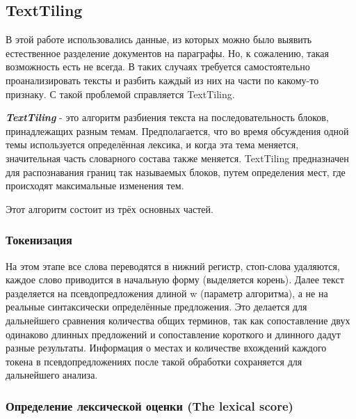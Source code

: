 \documentclass[14pt]{matmex-diploma-custom}
\begin{document}
\subsection{TextTiling}

В этой работе использовались данные, из которых можно было выявить естественное разделение документов на параграфы. Но, к сожалению, такая возможность есть не всегда. В таких случаях требуется самостоятельно проанализировать тексты и разбить каждый из них на части по какому-то признаку. С такой проблемой справляется TextTiling.

\textbf{\textit{TextTiling}} - это алгоритм разбиения текста на последовательность блоков, принадлежащих разным темам. Предполагается, что во время обсуждения одной темы используется определённая лексика, и когда эта тема меняется, значительная часть словарного состава также меняется. TextTiling предназначен для распознавания границ так называемых блоков, путем определения мест, где происходят максимальные изменения тем. 

Этот алгоритм состоит из трёх основных частей.

\subsubsection{Токенизация}
На этом этапе все слова переводятся в нижний регистр, стоп-слова удаляются, каждое слово приводится в начальную форму (выделяется корень). Далее текст разделяется на псевдопредложения длиной w (параметр алгоритма), а не на реальные синтаксически определённые предложения. Это делается для дальнейшего сравнения количества общих терминов, так как сопоставление двух одинаково длинных предложений и сопоставление короткого и длинного дадут разные результаты. Информация о местах и количестве вхождений каждого токена в псевдопредложениях после такой обработки сохраняется для дальнейшего анализа.

\subsubsection{Определение лексической оценки (The lexical score)}
\end{document}
